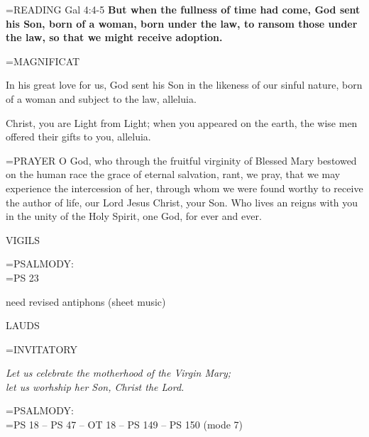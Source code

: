\hangindent=\parindent \small{READING}    Gal 4:4-5 \textbf{   But when the fullness of time had come, God sent his Son, born of a woman, born under the law, to ransom those under the law, so that we might receive adoption.\\}

\hangindent=\parindent \small MAGNIFICAT
\begin{description}[labelindent=\parindent, noitemsep, leftmargin=*]
\item [(before the Epiphany):]  In his great love for us, God sent his Son in the likeness of our sinful nature, born of a woman and subject to the law, alleluia.
\item [(Tuesday after the Epiphany):]  Christ, you are Light from Light; when you appeared on the earth, the wise men offered their gifts to you, alleluia.
\end{description}

\hangindent=\parindent \small{PRAYER 	O God, who through the fruitful virginity of Blessed Mary bestowed on the human race the grace of eternal salvation, rant, we pray, that we may experience the intercession of her, through whom we were found worthy to receive the author of life, our Lord Jesus Christ, your Son. Who lives an reigns with you in the unity of the Holy Spirit, one God, for ever and ever.}

\begin{flushleft}\normalsize VIGILS\\\end{flushleft}

\hangindent=\parindent \small{PSALMODY:}\\
\hangindent=\parindent  PS 23\vspace{0.5em}

need revised antiphons (sheet music)

\begin{flushleft}\normalsize LAUDS\\\end{flushleft}

\hangindent=\parindent \small{INVITATORY}
\begin{center}
\textit{Let us celebrate the motherhood of the Virgin Mary;\\}
\textit{let us worhship her Son, Christ the Lord.\\}
\end{center}

\hangindent=\parindent \small{PSALMODY:}\\
\hangindent=\parindent  PS 18 -- PS 47 -- OT 18 -- PS 149 -- PS 150 (mode 7)\vspace{0.5em}


